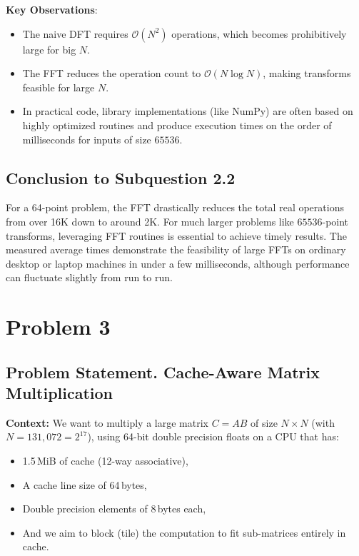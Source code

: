 \documentclass[11pt]{article}
\begin{document}
\bigskip

\noindent \textbf{Key Observations}:
\begin{itemize}
\item The naive DFT requires \(\mathcal{O}(N^2)\) operations, which becomes prohibitively large for big \(N\).
\item The FFT reduces the operation count to \(\mathcal{O}(N \log N)\), making transforms feasible for large \(N\).
\item In practical code, library implementations (like NumPy) are often based on highly optimized routines and produce execution times on the order of milliseconds for inputs of size \(65536\).
\end{itemize}

\noindent \subsection*{Conclusion to Subquestion 2.2}  
For a 64-point problem, the FFT drastically reduces the total real operations from over 16K down to around 2K. For much larger problems like \(65536\)-point transforms, leveraging FFT routines is essential to achieve timely results. The measured average times demonstrate the feasibility of large FFTs on ordinary desktop or laptop machines in under a few milliseconds, although performance can fluctuate slightly from run to run.


\section*{Problem 3}

\subsection*{Problem Statement. Cache-Aware Matrix Multiplication}

\noindent
\textbf{Context:} We want to multiply a large matrix $C = AB$ of size $N \times N$ (with $N = 131{,}072 = 2^{17}$), using 64-bit double precision floats on a CPU that has:
\begin{itemize}
  \item 1.5\,MiB of cache (12-way associative),
  \item A cache line size of 64\,bytes,
  \item Double precision elements of 8\,bytes each,
  \item And we aim to block (tile) the computation to fit sub-matrices entirely in cache.
\end{itemize}
\end{document}
